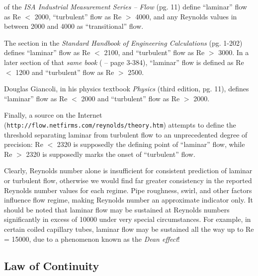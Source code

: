 \vskip 10pt

\noindent
{} of the \textit{ISA Industrial Measurement Series -- Flow} (pg. 11) define ``laminar'' flow as Re $<$ 2000, ``turbulent'' flow as Re $>$ 4000, and any Reynolds values in between 2000 and 4000 as ``transitional'' flow.

\vskip 10pt

\noindent
The  section in the \textit{Standard Handbook of Engineering Calculations} (pg. 1-202) defines ``laminar'' flow as Re $<$ 2100, and ``turbulent'' flow as Re $>$ 3000.  In a later section of that \textit{same book} ( -- page 3-384), ``laminar'' flow is defined as Re $<$ 1200 and ``turbulent'' flow as Re $>$ 2500.

\vskip 10pt

\noindent
Douglas Giancoli, in his physics textbook \textit{Physics} (third edition, pg. 11), defines ``laminar'' flow as Re $<$ 2000 and ``turbulent'' flow as Re $>$ 2000.

\vskip 10pt

\noindent
Finally, a source on the Internet (\texttt{http://flow.netfirms.com/reynolds/theory.htm}) attempts to define the threshold separating laminar from turbulent flow to an unprecedented degree of precision: Re $<$ 2320 is supposedly the defining point of ``laminar'' flow, while Re $>$ 2320 is supposedly marks the onset of ``turbulent'' flow.

\vskip 10pt

Clearly, Reynolds number alone is insufficient for consistent prediction of laminar or turbulent flow, otherwise we would find far greater consistency in the reported Reynolds number values for each regime.  Pipe roughness, swirl, and other factors influence flow regime, making Reynolds number an approximate indicator only.  It should be noted that laminar flow may be sustained at Reynolds numbers significantly in excess of 10000 under very special circumstances.  For example, in certain coiled capillary tubes, laminar flow may be sustained all the way up to Re = 15000, due to a phenomenon known as the \textit{Dean effect}!  









\filbreak
\subsection{Law of Continuity}

